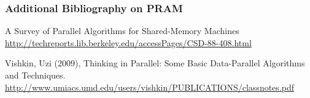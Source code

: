\documentclass[14pt]{beamer}
\begin{document}
\begin{frame}\frametitle{Additional Bibliography on PRAM}

\begin{references}
A Survey of Parallel Algorithms for Shared-Memory Machines
\url{http://techreports.lib.berkeley.edu/accessPages/CSD-88-408.html}
\end{references}

\begin{references}
Vishkin, Uzi (2009), Thinking in Parallel: Some Basic Data-Parallel Algorithms and
Techniques.    
\url{http://www.umiacs.umd.edu/users/vishkin/PUBLICATIONS/classnotes.pdf}    
\end{references}
\end{frame}
\end{document}
